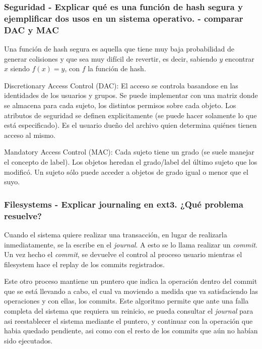 \subsubsection{Seguridad - Explicar qué es una función de hash segura y ejemplificar dos usos en un sistema operativo. - comparar DAC y MAC}

Una función de hash segura es aquella que tiene muy baja probabilidad de generar colisiones y que sea muy difícil de revertir, es decir, sabiendo $y$ encontrar $x$ siendo $f(x) = y$, con $f$ la función de hash.

Discretionary Access Control (DAC): El acceso se controla basandose en las identidades de los usuarios y grupos. Se puede implementar con una matriz donde se almacena para cada sujeto, los distintos permisos sobre cada objeto. Los atributos de seguridad se definen explicitamente (se puede hacer solamente lo que está especificado). Es el usuario dueño del archivo quien determina quiénes tienen acceso al mismo.

Mandatory Access Control (MAC): Cada sujeto tiene un grado (se suele manejar el concepto de label). Los objetos heredan el grado/label del último sujeto que los modificó. Un sujeto sólo puede acceder a objetos de grado igual o menor que el suyo.

\subsubsection{Filesystems - Explicar journaling en ext3. ¿Qué problema resuelve?}

Cuando el sistema quiere realizar una transacción, en lugar de realizarla inmediatamente, se la escribe en el \textit{journal}. A esto se lo llama realizar un \textit{commit}. Un vez hecho el \textit{commit}, se devuelve el control al proceso usuario mientras el filesystem hace el replay de los commits registrados.

Este otro proceso mantiene un puntero que indica la operación dentro del commit que se está llevando a cabo, el cual va moviendo a medida que va satisfaciendo las operaciones y con ellas, los commits. Este algoritmo permite que ante una falla completa del sistema que requiera un reinicio, se pueda consultar el \textit{journal} para asi reestablecer el sistema mediante el puntero, y continuar con la operación que habia quedado pendiente, asi como con el resto de los commits que aún no habían sido ejecutados.